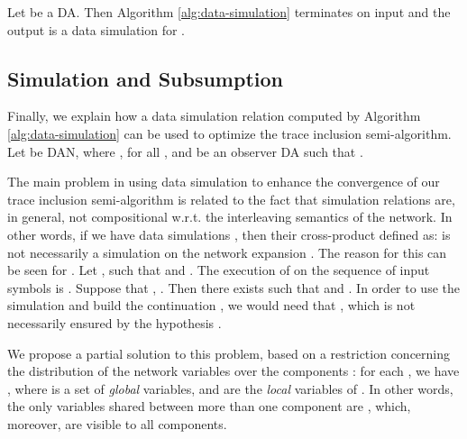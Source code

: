 \documentclass{llncs}
\begin{document}
\begin{theorem}\label{thm:simulation}
  Let  be a
  DA. Then Algorithm \ref{alg:data-simulation} terminates on input 
  and the output is a data simulation  for . 
\end{theorem}

\subsection{Simulation and Subsumption}


Finally, we explain how a data simulation relation computed by
Algorithm \ref{alg:data-simulation} can be used to optimize the trace
inclusion semi-algorithm. Let 
be DAN, where , for
all , and  be an
observer DA such that .

The main problem in using data simulation to enhance the convergence
of our trace inclusion semi-algorithm is related to the fact that
simulation relations are, in general, not compositional w.r.t.  the
interleaving semantics of the network. In other words, if we have 
data simulations , then their cross-product 
defined as:  is not necessarily a
simulation on the network expansion . The reason for
this can be seen for . Let , such that  and
. The execution of  on the
sequence of input symbols  is . Suppose that
, . Then there exists
 such that  and . In order to use the simulation and build the continuation
, we would need that
, which is not necessarily
ensured by the hypothesis .

We propose a partial solution to this problem, based on a restriction
concerning the distribution of the network variables
 over the
components : for each , we have , where  is a set of
\emph{global} variables, and  are the \emph{local}
variables of . In other words, the only variables shared between
more than one component are , which, moreover, are visible
to all components.
\end{document}
